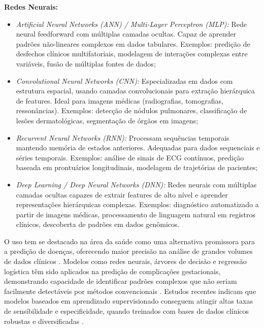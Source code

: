 \documentclass[12pt, a4paper]{report}
\theoremstyle{definition}
\theoremstyle{remark}
\theoremstyle{plain}
\begin{document}
\textbf{Redes Neurais:}
\begin{itemize}[noitemsep,topsep=0pt]
    \item \textit{Artificial Neural Networks (ANN) / Multi-Layer Perceptron (MLP):} Rede neural feedforward com múltiplas camadas ocultas. Capaz de aprender padrões não-lineares complexos em dados tabulares. Exemplos: predição de desfechos clínicos multifatoriais, modelagem de interações complexas entre variáveis, fusão de múltiplas fontes de dados;
    
    \item \textit{Convolutional Neural Networks (CNN):} Especializadas em dados com estrutura espacial, usando camadas convolucionais para extração hierárquica de features. Ideal para imagens médicas (radiografias, tomografias, ressonâncias). Exemplos: detecção de nódulos pulmonares, classificação de lesões dermatológicas, segmentação de órgãos em imagens;
    
    \item \textit{Recurrent Neural Networks (RNN):} Processam sequências temporais mantendo memória de estados anteriores. Adequadas para dados sequenciais e séries temporais. Exemplos: análise de sinais de ECG contínuos, predição baseada em prontuários longitudinais, modelagem de trajetórias de pacientes;
    
    \item \textit{Deep Learning / Deep Neural Networks (DNN):} Redes neurais com múltiplas camadas ocultas capazes de extrair features de alto nível e aprender representações hierárquicas complexas. Exemplos: diagnóstico automatizado a partir de imagens médicas, processamento de linguagem natural em registros clínicos, descoberta de padrões em dados genômicos.
\end{itemize}

 O uso tem se destacado na área da saúde como uma alternativa promissora para a predição de doenças, oferecendo maior precisão na análise de grandes volumes de dados clínicos \cite{Shickel2018}. Modelos como redes neurais, árvores de decisão e regressão logística têm sido aplicados na predição de complicações gestacionais, demonstrando capacidade de identificar padrões complexos que não seriam facilmente detectáveis por métodos convencionais \cite{Artzi2020}. Estudos recentes indicam que modelos baseados em aprendizado supervisionado conseguem atingir altas taxas de sensibilidade e especificidade, quando treinados com bases de dados clínicos robustas e diversificadas \cite{Maric2020}.
\end{document}
